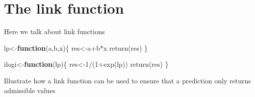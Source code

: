 \documentclass[
]{book}
\newenvironment{Shaded}{\begin{snugshade}}{\end{snugshade}}
\newcommand{\ControlFlowTok}[1]{\textcolor[rgb]{0.13,0.29,0.53}{\textbf{#1}}}
\newcommand{\DecValTok}[1]{\textcolor[rgb]{0.00,0.00,0.81}{#1}}
\newcommand{\FunctionTok}[1]{\textcolor[rgb]{0.00,0.00,0.00}{#1}}
\newcommand{\NormalTok}[1]{#1}
\newcommand{\OtherTok}[1]{\textcolor[rgb]{0.56,0.35,0.01}{#1}}
\newcommand{\SpecialCharTok}[1]{\textcolor[rgb]{0.00,0.00,0.00}{#1}}
\begin{document}
\hypertarget{the-link-function}{%
\section{The link function}\label{the-link-function}}

Here we talk about link functions

\begin{Shaded}
\begin{Highlighting}[]
\NormalTok{lp}\OtherTok{\textless{}{-}}\ControlFlowTok{function}\NormalTok{(a,b,x)\{}
\NormalTok{  res}\OtherTok{\textless{}{-}}\NormalTok{a}\SpecialCharTok{+}\NormalTok{b}\SpecialCharTok{*}\NormalTok{x}
  \FunctionTok{return}\NormalTok{(res)}
\NormalTok{\}}

\NormalTok{ilogi}\OtherTok{\textless{}{-}}\ControlFlowTok{function}\NormalTok{(lp)\{}
\NormalTok{  res}\OtherTok{\textless{}{-}}\DecValTok{1}\SpecialCharTok{/}\NormalTok{(}\DecValTok{1}\SpecialCharTok{+}\FunctionTok{exp}\NormalTok{(lp))}
  \FunctionTok{return}\NormalTok{(res)}
\NormalTok{\}}
\end{Highlighting}
\end{Shaded}

Illustrate how a link function can be used to ensure that a prediction only returns admissible values
\end{document}

